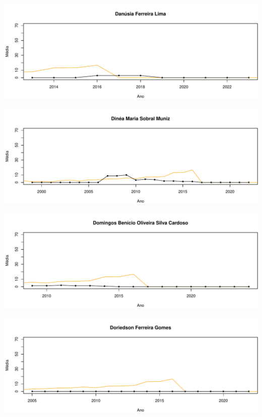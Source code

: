 \documentclass[12pt,brazil]{article}\usepackage[]{graphicx}\usepackage[]{xcolor}
\makeatletter
\def\maxwidth{ %
  \ifdim\Gin@nat@width>\linewidth
    \linewidth
  \else
    \Gin@nat@width
  \fi
}
\makeatother
\begin{document}
\vspace{0.5cm}


{\centering \includegraphics[width=\maxwidth]{figure/mediamovel-15} 

}



\vspace{0.5cm}


{\centering \includegraphics[width=\maxwidth]{figure/mediamovel-16} 

}



\vspace{0.5cm}


{\centering \includegraphics[width=\maxwidth]{figure/mediamovel-17} 

}



\vspace{0.5cm}


{\centering \includegraphics[width=\maxwidth]{figure/mediamovel-18} 

}
\end{document}
